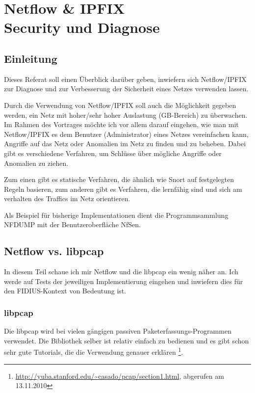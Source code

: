 \section[Netflow \& IPFIX -- Security und Diagnose]
  {Netflow \& IPFIX\\Security und Diagnose}
\label{compositions:netflow-security}
\authors{\KUH}{}

\subsection{Einleitung}
Dieses Referat soll einen Überblick darüber geben, inwiefern sich
Netflow/IPFIX zur Diagnose und zur Verbesserung der Sicherheit eines
Netzes verwenden lassen. 

Durch die Verwendung von Netflow/IPFIX soll auch die Möglichkeit gegeben
werden, ein Netz mit hoher/sehr hoher Auslastung (GB-Bereich) zu
überwachen. Im Rahmen des Vortrages möchte ich vor allem darauf
eingehen, wie man mit Netflow/IPFIX es dem Benutzer (Administrator)
eines Netzes vereinfachen kann, Angriffe auf das Netz oder Anomalien im
Netz zu finden und zu beheben. Dabei gibt es verschiedene Verfahren, um
Schlüsse über mögliche Angriffe oder Anomalien zu ziehen.

Zum einen gibt es statische Verfahren, die ähnlich wie Snort auf
festgelegten Regeln basieren, zum anderen gibt es Verfahren, die
lernfähig sind und sich am verhalten des Traffics im Netz orientieren.

Als Beispiel für bisherige Implementationen dient die Programmsammlung
NFDUMP mit der Benutzeroberfläche NfSen.

\subsection{Netflow vs. libpcap}

In diesem Teil schaue ich mir Netflow und die libpcap ein wenig näher an.
Ich werde auf Tests der jeweiligen Implementierung eingehen und inwiefern
dies für den FIDIUS-Kontext von Bedeutung ist.

\subsubsection{libpcap}

Die libpcap wird bei vielen gängigen passiven Paketerfassungs-Programmen
verwendet. Die Bibliothek selber ist relativ einfach zu bedienen und es
gibt schon sehr gute Tutorials, die die Verwendung genauer erklären%
\footnote{\url{http://yuba.stanford.edu/~casado/pcap/section1.html},
abgerufen am 13.11.2010}.

